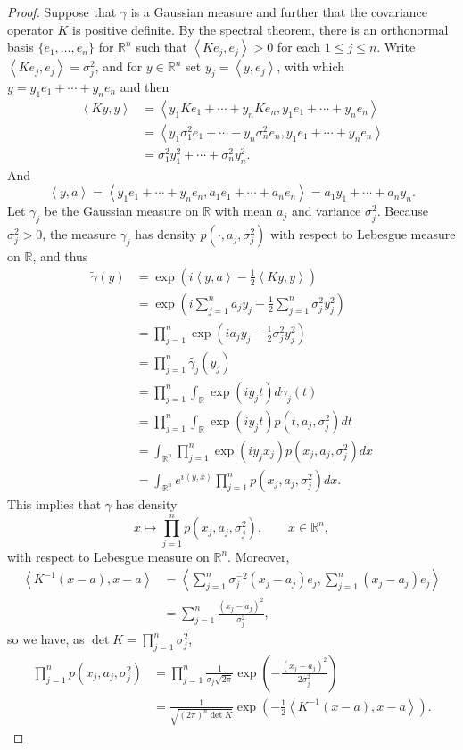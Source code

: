\documentclass{article}
\newcommand{\inner}[2]{\left\langle #1, #2 \right\rangle}
\theoremstyle{definition}
\begin{document}
\begin{proof}
Suppose that $\gamma$ is a Gaussian measure and  further  that the covariance operator $K$ is positive definite. By the spectral theorem,
there is an orthonormal basis $\{e_1,\ldots,e_n\}$ for $\mathbb{R}^n$ such that $\inner{Ke_j}{e_j}>0$ for each
$1 \leq j \leq n$. Write $\inner{Ke_j}{e_j}=\sigma_j^2$, and for $y \in \mathbb{R}^n$ set
$y_j = \inner{y}{e_j}$, with which $y = y_1e_1 + \cdots + y_n e_n$ and then
\begin{align*}
\inner{Ky}{y} &= \inner{y_1Ke_1+\cdots+y_nKe_n}{y_1e_1+\cdots+y_ne_n}\\
&=\inner{y_1\sigma_1^2 e_1+ \cdots + y_n \sigma_n^2 e_n}{y_1e_1+\cdots+y_ne_n}\\
&=\sigma_1^2 y_1^2  + \cdots +  \sigma_n^2 y_n^2.
\end{align*}
And
\[
\inner{y}{a} = \inner{y_1e_1+\cdots+y_ne_n}{a_1e_1+\cdots+a_ne_n}
=a_1 y_1 + \cdots + a_n y_n.
\]
Let $\gamma_j$ be the Gaussian measure on $\mathbb{R}$ with mean $a_j$ and variance $\sigma_j^2$.
Because $\sigma_j^2>0$, the measure $\gamma_j$ has
density $p(\cdot,a_j,\sigma_j^2)$ with respect to Lebesgue measure on $\mathbb{R}$, and thus
\begin{align*}
\widetilde{\gamma}(y)&=\exp\left(i \inner{y}{a} - \frac{1}{2} \inner{Ky}{y} \right)\\
&= \exp\left(i \sum_{j=1}^n a_j y_j - \frac{1}{2} \sum_{j=1}^n \sigma_j^2 y_j^2 \right)\\
 &=\prod_{j=1}^n \exp\left(ia_jy_j - \frac{1}{2} \sigma_j^2 y_j^2 \right)\\
 &=\prod_{j=1}^n \widetilde{\gamma_j}(y_j)\\
 &=\prod_{j=1}^n \int_{\mathbb{R}} \exp(iy_j t) d\gamma_j(t)\\
 &=\prod_{j=1}^n \int_{\mathbb{R}} \exp(iy_j t) p(t,a_j,\sigma_j^2) dt\\
 &=\int_{\mathbb{R}^n} \prod_{j=1}^n \exp(iy_j x_j) p(x_j,a_j,\sigma_j^2) dx\\
 &=\int_{\mathbb{R}^n} e^{i\inner{y}{x}} \prod_{j=1}^n p(x_j,a_j,\sigma_j^2) dx.
\end{align*}
This implies that $\gamma$ has density
\[
x \mapsto \prod_{j=1}^n p(x_j,a_j,\sigma_j^2), \qquad x \in \mathbb{R}^n,
\]
with respect to Lebesgue measure on $\mathbb{R}^n$.
Moreover,
\begin{align*}
\inner{K^{-1}(x-a)}{x-a}&=\inner{\sum_{j=1}^n \sigma_j^{-2} (x_j-a_j)e_j}{\sum_{j=1}^n (x_j-a_j)e_j}\\
&=\sum_{j=1}^n  \frac{(x_j-a_j)^2}{\sigma_j^2},
\end{align*}
so we have, as $\det K = \prod_{j=1}^n \sigma_j^2$,
\begin{align*}
\prod_{j=1}^n p(x_j,a_j,\sigma_j^2) &= 
\prod_{j=1}^n  \frac{1}{\sigma_j \sqrt{2\pi}}  \exp\left( - \frac{(x_j-a_j)^2}{2\sigma_j^2} \right)\\
&=\frac{1}{\sqrt{(2\pi)^n \det K}} \exp\left(-\frac{1}{2} \inner{K^{-1}(x-a)}{x-a} \right).
\end{align*}
\end{proof}
\end{document}
